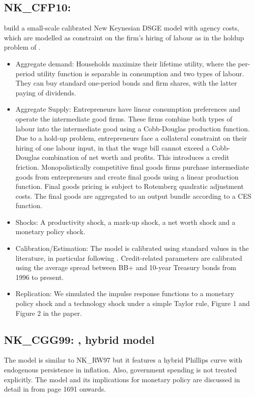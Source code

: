 \documentclass[11pt,a4paper]{article}
\begin{document}
	
	\subsection{NK\_CFP10: \texorpdfstring{\cite{carlstrom2010optimal}}{Carlstrom et al. (2010)}}
	\label{NKCFP10}
	\cite{carlstrom2010optimal} build a small-scale calibrated New Keynesian DSGE model with agency costs, which are modelled as constraint on the firm's hiring of labour as in the holdup problem of \cite{KiyotakiMoore1999}. 
	\begin{itemize}
		\item Aggregate demand: Households maximize their lifetime utility, where the per-period utility function is separable in consumption and two types of labour. They can buy standard one-period bonds and firm shares, with the latter paying of dividends. 
		\item Aggregate Supply: Entrepreneurs have linear consumption preferences and operate the intermediate good firms. These firms combine both types of labour into the intermediate good using a Cobb-Douglas production function. Due to a hold-up problem, entrepreneurs face a collateral constraint on their hiring of one labour input, in that the wage bill cannot exceed  a Cobb-Douglas combination of net worth and profits. This introduces a credit friction. Monopolistically competitive final goods firms purchase intermediate goods from entrepreneurs and create final goods using a linear production function. Final goods pricing is subject to Rotemberg quadratic adjustment costs. The final goods are aggregated to an output bundle according to a CES function. 
		\item Shocks: A productivity shock, a mark-up shock, a net worth shock and a monetary policy shock. 
		\item Calibration/Estimation: The model is calibrated using standard values in the literature, in particular following \cite{Woodford2003}.  Credit-related parameters are calibrated using the average spread between BB+ and 10-year Treasury bonds from 1996 to present. 
		\item Replication: We simulated the impulse response functions to a monetary policy shock and a technology shock under a simple Taylor rule, Figure 1 and Figure 2 in the paper. 
		
	\end{itemize}
	
	\subsection{NK\_CGG99: \texorpdfstring{\cite{ClaridaGaliGertler1999}}{Clarida et al. (1999)}, hybrid model}
	\label{NKCGG99}
	The model is similar to NK\_RW97 but it features a hybrid
	Phillips curve with endogenous persistence in inflation. Also, government spending is
	not treated explicitly. The
	model and its implications for monetary policy are discussed in
	detail in \cite{ClaridaGaliGertler1999} from page 1691 onwards.
	
\end{document}
